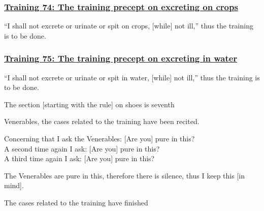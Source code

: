 \subsubsection*{\hyperref[sekh74]{Training 74: The training precept on excreting on crops}}
\label{training74}
``I shall not excrete or urinate or spit on crops, [while] not ill,'' thus the training is to be done.



\subsubsection*{\hyperref[sekh75]{Training 75: The training precept on excreting in water}}
\label{training75}

``I shall not excrete or urinate or spit in water, [while] not ill,'' thus the training is to be done.

\begin{center}
	The section [starting with the rule] on shoes is seventh
\end{center}



\medskip

\begin{center}
	Venerables, the cases related to the training have been recited.

	\smallskip

	Concerning that I ask the Venerables: [Are you] pure in this?\\
	A second time again I ask: [Are you] pure in this?\\
	A third time again I ask: [Are you] pure in this?

	\smallskip

	The Venerables are pure in this, therefore there is silence, thus I keep this [in mind].
\end{center}

\begin{outro}
	The cases related to the training have finished
\end{outro}

\clearpage

